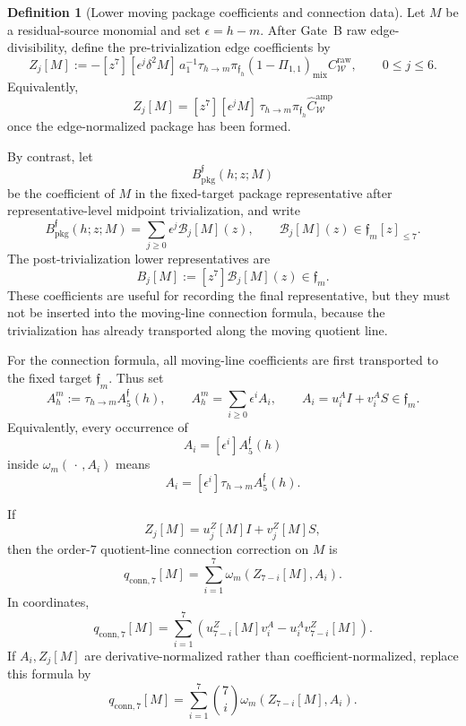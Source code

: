 \documentclass[11pt,a4paper]{amsart}
\theoremstyle{plain}
\theoremstyle{definition}
\newtheorem{definition}[theorem]{Definition}
\begin{document}
\begin{definition}[Lower moving package coefficients and connection data]
\label{def:lower-moving-package-coefficients}
Let \(M\) be a residual-source monomial and set \(\epsilon=h-m\).  After
Gate~B raw edge-divisibility, define the pre-trivialization edge
coefficients by
\[
Z_j[M]
:=
-[z^7][\epsilon^j\delta^2M]\,
a_1^{-1}\tau_{h\to m}
\pi_{\mathfrak f_h}
(1-\Pi_{1,1})_{\mathrm{mix}}C_{\mathcal W}^{\mathrm{raw}},
\qquad
0\le j\le 6.
\]
Equivalently,
\[
Z_j[M]
=
[z^7][\epsilon^jM]\,
\tau_{h\to m}\pi_{\mathfrak f_h}
\widehat C_{\mathcal W}^{\mathrm{amp}}
\]
once the edge-normalized package has been formed.

By contrast, let
\[
B_{\mathrm{pkg}}^{\mathfrak f}(h;z;M)
\]
be the coefficient of \(M\) in the fixed-target package representative
after representative-level midpoint trivialization, and write
\[
B_{\mathrm{pkg}}^{\mathfrak f}(h;z;M)
=
\sum_{j\ge0}\epsilon^j\mathcal B_j[M](z),
\qquad
\mathcal B_j[M](z)\in\mathfrak f_m[z]_{\le7}.
\]
The post-trivialization lower representatives are
\[
B_j[M]:=[z^7]\mathcal B_j[M](z)\in\mathfrak f_m.
\]
These coefficients are useful for recording the final representative, but
they must not be inserted into the moving-line connection formula, because
the trivialization has already transported along the moving quotient
line.

For the connection formula, all moving-line coefficients are first
transported to the fixed target \(\mathfrak f_m\).  Thus set
\[
A_h^m:=\tau_{h\to m}A_5^{\mathfrak f}(h),
\qquad
A_h^m=\sum_{i\ge0}\epsilon^iA_i,
\qquad
A_i=u_i^AI+v_i^AS\in\mathfrak f_m.
\]
Equivalently, every occurrence of
\[
A_i=[\epsilon^i]A_5^{\mathfrak f}(h)
\]
inside \(\omega_m(\,\cdot\,,A_i)\) means
\[
A_i=[\epsilon^i]\tau_{h\to m}A_5^{\mathfrak f}(h).
\]

If
\[
Z_j[M]=u_j^Z[M]I+v_j^Z[M]S,
\]
then the order-\(7\) quotient-line connection correction on \(M\) is
\[
q_{\mathrm{conn},7}[M]
=
\sum_{i=1}^{7}
\omega_m(Z_{7-i}[M],A_i).
\]
In coordinates,
\[
q_{\mathrm{conn},7}[M]
=
\sum_{i=1}^{7}
\left(
u_{7-i}^Z[M]v_i^A
-
u_i^Av_{7-i}^Z[M]
\right).
\]
If \(A_i,Z_j[M]\) are derivative-normalized rather than
coefficient-normalized, replace this formula by
\[
q_{\mathrm{conn},7}[M]
=
\sum_{i=1}^{7}\binom{7}{i}
\omega_m(Z_{7-i}[M],A_i).
\]
\end{definition}
\end{document}

